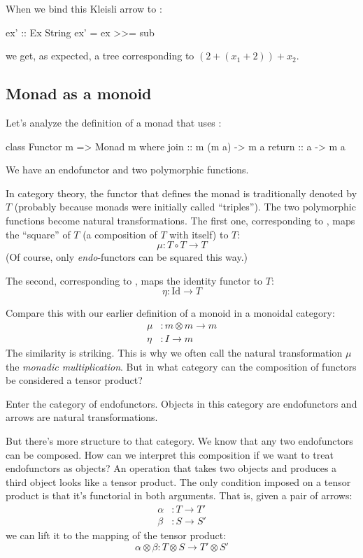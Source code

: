 \documentclass[DaoFP]{subfiles}
\begin{document}
When we bind this Kleisli arrow to :
\begin{haskell}
ex' :: Ex String
ex' = ex >>= sub
\end{haskell}
we get, as expected, a tree corresponding to $(2 + (x_1 + 2)) + x_2$.

\subsection{Monad as a monoid}

Let's analyze the definition of a monad that uses :
\begin{haskell}
class Functor m => Monad m where
  join :: m (m a) -> m a
  return :: a -> m a
\end{haskell}
We have an endofunctor  and two polymorphic functions. 

In category theory, the functor that defines the monad is traditionally denoted by $T$ (probably because monads were initially called ``triples''). The two polymorphic functions become natural transformations. The first one, corresponding to , maps the ``square'' of $T$ (a composition of $T$ with itself) to $T$:
\[ \mu \colon T \circ T \to T \]
(Of course, only \emph{endo}-functors can be squared this way.) 

The second, corresponding to , maps the identity functor to $T$:
\[ \eta \colon \text{Id} \to T \]

Compare this with our earlier definition of a monoid in a monoidal category:
\begin{align*}
\mu &\colon m \otimes m \to m \\
\eta &\colon I \to m
\end{align*}
The similarity is striking. This is why we often call the natural transformation $\mu$ the \emph{monadic multiplication}. But in what category can the composition of functors be considered a tensor product? 

Enter the category of endofunctors. Objects in this category are endofunctors and arrows are natural transformations. 

But there's more structure to that category. We know that any two endofunctors can be composed. How can we interpret this composition if we want to treat endofunctors as objects? An operation that takes two objects and produces a third object looks like a tensor product.  The only condition imposed on a tensor product is that it's functorial in both arguments. That is, given a pair of arrows:
\begin{align*}
 \alpha &\colon T \to T' \\
 \beta &\colon S \to S' 
\end{align*}
 we can lift it to the mapping of the tensor product:
 \[ \alpha \otimes \beta \colon T \otimes S \to T' \otimes S' \]
 
\end{document}
